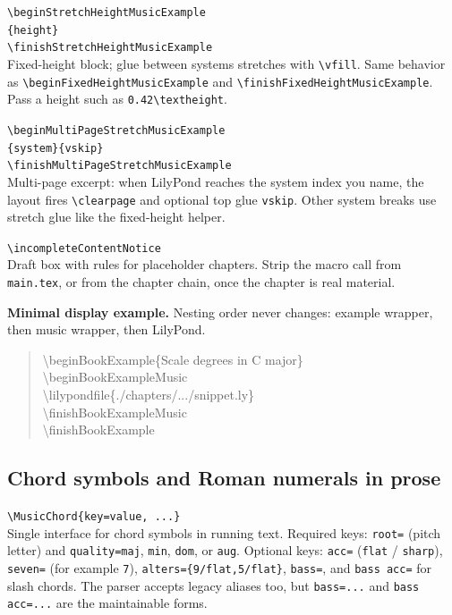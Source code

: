 \noindent\texttt{\textbackslash beginStretchHeightMusicExample}\\
\texttt{\{height\}}\\
\texttt{\textbackslash finishStretchHeightMusicExample}\\
Fixed-height block; glue between systems stretches with \verb|\vfill|. Same behavior as \verb|\beginFixedHeightMusicExample| and \verb|\finishFixedHeightMusicExample|. Pass a height such as \verb|0.42\textheight|.

\noindent\texttt{\textbackslash beginMultiPageStretchMusicExample}\\
\texttt{\{system\}\{vskip\}}\\
\texttt{\textbackslash finishMultiPageStretchMusicExample}\\
Multi-page excerpt: when LilyPond reaches the system index you name, the layout fires \verb|\clearpage| and optional top glue \verb|vskip|. Other system breaks use stretch glue like the fixed-height helper.

\noindent\texttt{\textbackslash incompleteContentNotice}\\
Draft box with rules for placeholder chapters. Strip the macro call from \verb|main.tex|, or from the chapter \verb|| chain, once the chapter is real material.

\noindent\textbf{Minimal display example.} Nesting order never changes: example wrapper, then music wrapper, then LilyPond.

\begin{quote}
\small\ttfamily\raggedright
\textbackslash beginBookExample\{Scale degrees in C major\}\\
\textbackslash beginBookExampleMusic\\
\textbackslash lilypondfile\{./chapters/.../snippet.ly\}\\
\textbackslash finishBookExampleMusic\\
\textbackslash finishBookExample
\end{quote}
\endgroup

\subsection*{Chord symbols and Roman numerals in prose}

\noindent\texttt{\textbackslash MusicChord\{key=value, ...\}}\\
Single interface for chord symbols in running text. Required keys: \verb|root=| (pitch letter) and \verb|quality=maj|, \verb|min|, \verb|dom|, or \verb|aug|. Optional keys: \verb|acc=| (\verb|flat| / \verb|sharp|), \verb|seven=| (for example \verb|7|), \verb|alters={9/flat,5/flat}|, \verb|bass=|, and \verb|bass acc=| for slash chords. The parser accepts legacy aliases too, but \verb|bass=...| and \verb|bass acc=...| are the maintainable forms.

